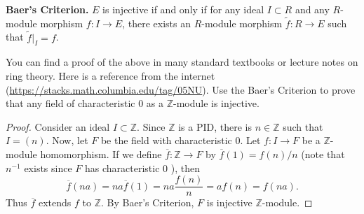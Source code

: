 \begin{enumerate}
\vspace{0.2cm}
\noindent\textbf{Baer's Criterion.} $E$ is injective if and only if for any ideal $I \subset R$ and any $R$-module morphism $f: I \to E$, there exists an $R$-module morphism $\tilde{f}: R \to E$ such that $\tilde{f}|_I = f$.

\vspace{0.2cm}
\noindent You can find a proof of the above in many standard textbooks or lecture notes on ring theory. Here is a reference from the internet (\url{https://stacks.math.columbia.edu/tag/05NU}).  Use the Baer's Criterion to prove that any field of characteristic 0 as a $\mathbb{Z}$-module is injective.
\end{enumerate}
\begin{proof}
	Consider an ideal $I \subset \mathbb{Z}$. Since $\mathbb{Z}$ is a PID, there is $n \in \mathbb{Z}$ such that $I = (n)$. Now, let $F $ be the field with characteristic $0$. Let $f: I \to F$ be a  $\mathbb{Z}$-module homomorphism. If we define $\overline{f} : \mathbb{Z} \to F$ by $\overline{f} (1) = f(n) / n$ (note that $n^{-1}$ exists since $F$ has characteristic $0$ ), then
	\[
		\overline{f} (n a) = n a \overline{f} (1)
		=  n a \frac{f(n)}{n} = a f(n) = f(n a)
	.\] 
	Thus  $\overline{f} $ extends $f$ to $\mathbb{Z}$. By Baer's Criterion, $F$ is injective $\mathbb{Z}$-module.
\end{proof}



